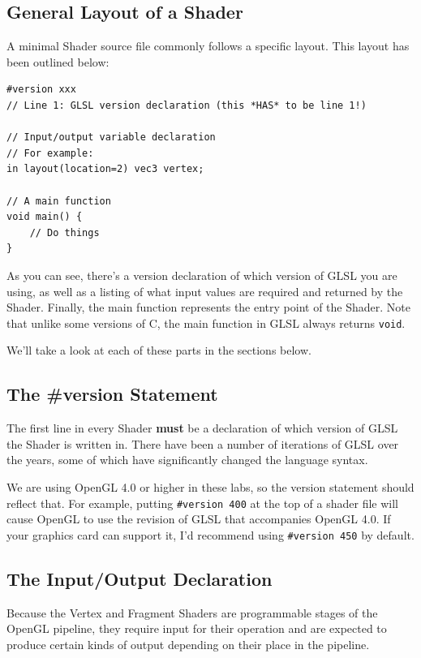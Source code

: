 \newpage

\subsection{General Layout of a Shader}

A minimal Shader source file commonly follows a specific layout. This layout has been outlined below:

\begin{verbatim}
#version xxx
// Line 1: GLSL version declaration (this *HAS* to be line 1!)

// Input/output variable declaration
// For example: 
in layout(location=2) vec3 vertex;

// A main function
void main() {
	// Do things
}
\end{verbatim}

As you can see, there's a version declaration of which version of GLSL you are using, as well as a listing of what input values are required and returned by the Shader. Finally, the main function represents the entry point of the Shader. Note that unlike some versions of C, the main function in GLSL always returns \texttt{void}.

We'll take a look at each of these parts in the sections below.

\subsection{The \#version Statement}

The first line in every Shader {\bf must} be a declaration of which version of GLSL the Shader is written in. There have been a number of iterations of GLSL over the years, some of which have significantly changed the language syntax. 

We are using OpenGL 4.0 or higher in these labs, so the version statement should reflect that. For example, putting \texttt{#version 400} at the top of a shader file will cause OpenGL to use the revision of GLSL that accompanies OpenGL 4.0. If your graphics card can support it, I'd recommend using \texttt{#version 450} by default.

\subsection{The Input/Output Declaration}

Because the Vertex and Fragment Shaders are programmable stages of the OpenGL pipeline, they require input for their operation and are expected to produce certain kinds of output depending on their place in the pipeline. 


